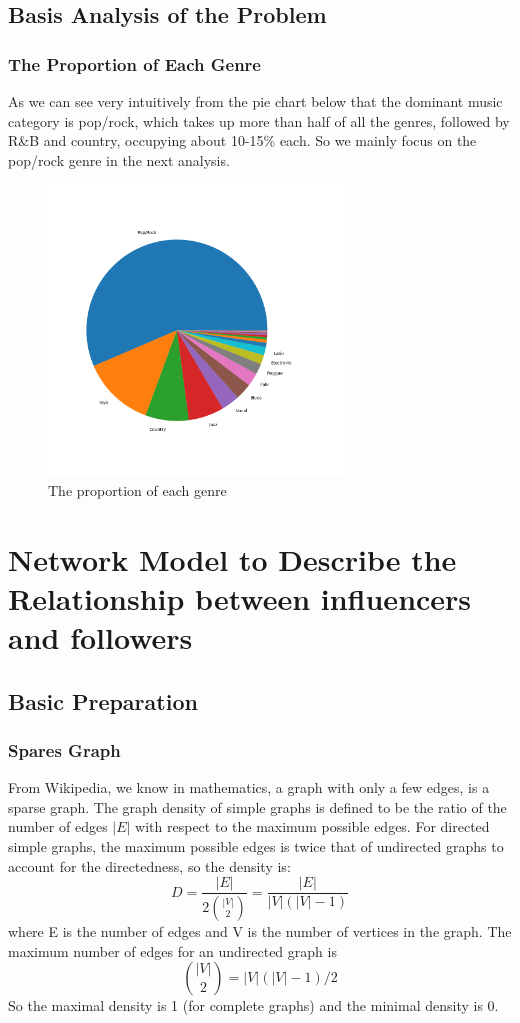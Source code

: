 \documentclass[12pt]{article}
\begin{document}
\subsection{Basis Analysis of the Problem}
\subsubsection{The Proportion of Each Genre}\quad\;
As we can see very intuitively from the pie chart below that the dominant music category is pop/rock, which takes up more than half of all the genres, followed by R\&B and country, occupying about 10-15\% each. So we mainly focus on the pop/rock genre in the next analysis.
\begin{figure}[h]
\small
\centering
\includegraphics[width=8cm]{Figure_1.png}
\caption{The proportion of each genre}
\end{figure}
\section{Network Model to Describe the Relationship between influencers and followers}
\subsection{Basic Preparation} 
\subsubsection{Spares Graph}\quad\;
From Wikipedia, we know in mathematics, a graph with only a few edges, is a sparse graph. 
The graph density of simple graphs is defined to be the ratio of the number of edges ${|E|}$ with respect to the maximum possible edges.
For directed simple graphs, the maximum possible edges is twice that of undirected graphs to account for the directedness, so the density is:
$${\displaystyle D={\frac {|E|}{2{\binom {|V|}{2}}}}={\frac {|E|}{|V|(|V|-1)}}}$$
where E is the number of edges and V is the number of vertices in the graph. The maximum number of edges for an undirected graph is 
$${\displaystyle {\binom {|V|}{2}}=|V|(|V|-1)/2}$$ So the maximal density is 1 (for complete graphs) and the minimal density is 0.
\end{document}
